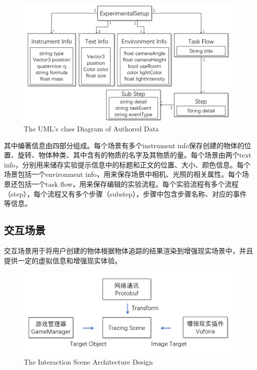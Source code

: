 \begin{figure}[!htp]
  \centering
  \includegraphics[width=12cm]{figure/setupclass.png}
    {The UML's class Diagram of Authored Data}
 \label{fig:uml}
\end{figure}

其中编著信息由四部分组成。每个场景有多个instrument info保存创建的物体的位置、旋转、物体种类、其中含有的物质的名字及其物质的量。每个场景由两个text info，分别用来储存实验提示信息中的标题和正文的位置、大小、颜色信息。每个场景包括一个environment info，用来保存场景中相机、光照的相关属性。每个场景还包括一个task flow，用来保存编辑的实验流程。每个实验流程有多个流程（step），每个流程又有多个步骤（substep），步骤中包含步骤名称、对应的事件等信息。


\subsection{交互场景}
交互场景用于将用户创建的物体根据物体追踪的结果渲染到增强现实场景中，并且提供一定的虚拟信息和增强现实体验。

\begin{figure}[!htp]
  \centering
  \includegraphics[width=12cm]{figure/tracingScene.png}
    {The Interaction Scene Architecture Design}
 \label{fig:int}
\end{figure}

